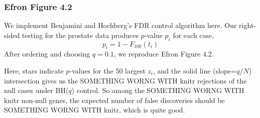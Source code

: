 \documentclass{article}
\newcommand{\rinline}[1]{SOMETHING WORNG WITH knitr}
\begin{document}


\subsubsection*{Efron Figure 4.2}
\hspace{12 pt} We implement Benjamini and Hochberg's FDR control
algorithm here. Our right-sided testing for the prostate data
produces $p$-value $p_i$ for each case, 
\begin{displaymath}
p_i = 1 - F_{100}(t_i)
\end{displaymath}
After ordering and choosing $q=0.1$, we reproduce Efron Figure 4.2. 


Here, stars indicate $p$-values for the 50 largest $z_i$, and the
solid line (slope=$q/N$) intersection gives us the \rinline{R}
rejections of the null cases under BH($q$) control. So among the
\rinline{R} non-null genes, the expected number of 
false discoveries should be \rinline{q*R}, which is quite good.
\end{document}

